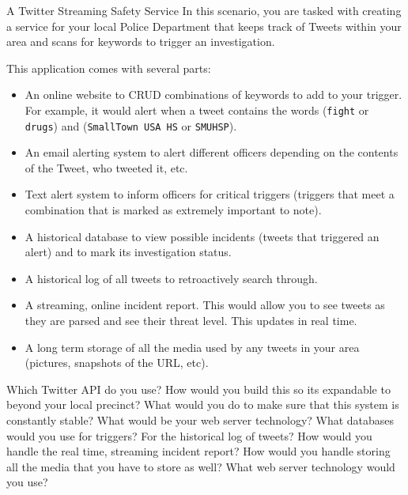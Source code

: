 \documentclass{homework}
\begin{document}
\newpage
\begin{problem}[3]{A Twitter Streaming Safety Service}
    In this scenario, you are tasked with creating a service for your local Police Department that keeps track of Tweets within your area and scans for keywords to trigger an investigation.
    
    \vskip 1mm
   
    This application comes with several parts:
    \begin{itemize}
        \item An online website to CRUD combinations of keywords to add to your trigger. For example, it would alert when a tweet contains the words (\texttt{fight} or \texttt{drugs}) and (\texttt{SmallTown USA HS} or \texttt{SMUHSP}).
        \item An email alerting system to alert different officers depending on the contents of the Tweet, who tweeted it, etc.
        \item Text alert system to inform officers for critical triggers (triggers that meet a combination that is marked as extremely important to note).
        \item A historical database to view possible incidents (tweets that triggered an alert) and to mark its investigation status.
        \item A historical log of all tweets to retroactively search through.
        \item A streaming, online incident report. This would allow you to see tweets as they are parsed and see their threat level. This updates in real time.
        \item A long term storage of all the media used by any tweets in your area (pictures, snapshots of the URL, etc).
    \end{itemize}
    Which Twitter API do you use? How would you build this so its expandable to beyond your local precinct? What would you do to make sure that this system is constantly stable? What would be your web server technology? What databases would you use for triggers? For the historical log of tweets? How would you handle the real time, streaming incident report? How would you handle storing all the media that you have to store as well? What web server technology would you use?
\end{problem}
\end{document}
